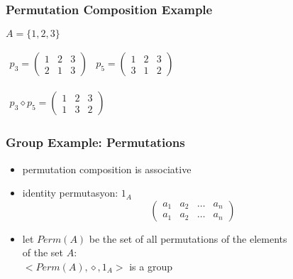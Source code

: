 \documentclass[dvipsnames]{beamer}
\begin{document}
\begin{frame}
  \frametitle{Permutation Composition Example}

  \begin{example}
    $A = \{1,2,3\}$

    \medskip
    $\begin{array}{cc}
      p_3 = \left(
        \begin{array}{ccc}
          1 & 2 & 3\\
          2 & 1 & 3
        \end{array}
      \right) &
      p_5 = \left(
        \begin{array}{ccc}
          1 & 2 & 3\\
          3 & 1 & 2
        \end{array}
      \right)
    \end{array}$

    \medskip
    $\begin{array}{c}
      p_3 \diamond p_5 = \left(
        \begin{array}{ccc}
          1 & 2 & 3\\
          1 & 3 & 2
        \end{array}
      \right)
    \end{array}$
  \end{example}
\end{frame}

\begin{frame}
  \frametitle{Group Example: Permutations}

  \begin{itemize}
    \item permutation composition is associative
    \item identity permutasyon: $1_A$
    \[\left(
      \begin{array}{cccc}
         a_1 & a_2 & \dots & a_n\\
         a_1 & a_2 & \dots & a_n
      \end{array}
    \right)\]

    \pause
    \medskip
    \item let $Perm(A)$ be the set of all permutations of the elements\\
      of the set $A$:\\
      $<Perm(A), \diamond, 1_A>$ is a group
  \end{itemize}
\end{frame}
\end{document}
